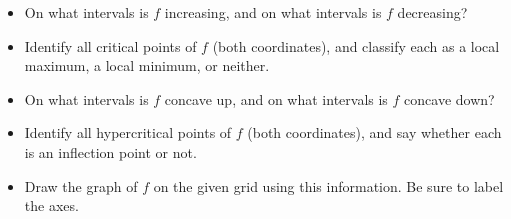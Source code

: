 \begin{itemize}
\item On what intervals is $f$ increasing, and on what intervals is $f$ decreasing?
\item Identify all critical points of $f$ (both coordinates), and classify each as a local maximum, a local minimum, or neither.
\item On what intervals is $f$ concave up, and on what intervals is $f$ concave down?
\item Identify all hypercritical points of $f$ (both coordinates), and say whether each is an inflection point or not.
\item Draw the graph of $f$ on the given grid using this information.
 Be sure to label the axes.
\end{itemize}

\newpage
\GraphingGrid


